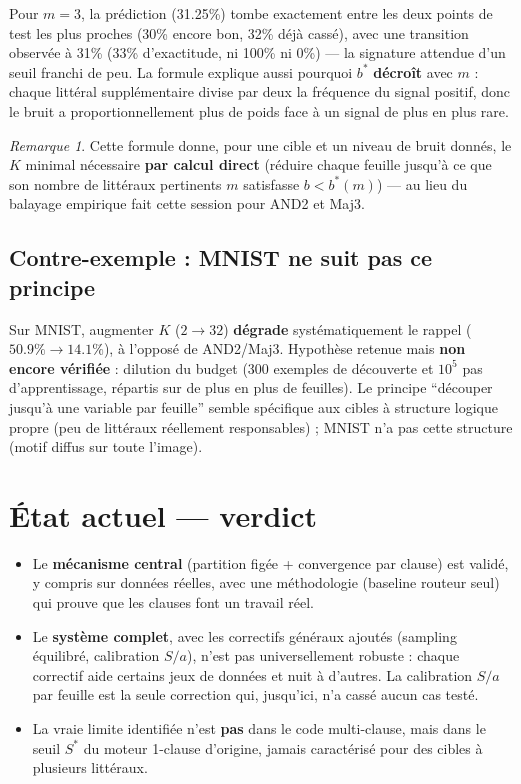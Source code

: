 \documentclass[12pt,a4paper]{article}
\theoremstyle{remark}
\newtheorem{remark}{Remarque}[section]
\newcommand{\Sstar}{S^{*}}
\begin{document}
Pour $m=3$, la prédiction (31.25\%) tombe exactement entre les deux points
de test les plus proches (30\% encore bon, 32\% déjà cassé), avec une
transition observée à 31\% (33\% d'exactitude, ni 100\% ni 0\%) --- la
signature attendue d'un seuil franchi de peu. La formule explique aussi
pourquoi $b^*$ \textbf{décroît} avec $m$ : chaque littéral supplémentaire
divise par deux la fréquence du signal positif, donc le bruit a
proportionnellement plus de poids face à un signal de plus en plus rare.

\begin{remark}
Cette formule donne, pour une cible et un niveau de bruit donnés, le $K$
minimal nécessaire \textbf{par calcul direct} (réduire chaque feuille jusqu'à
ce que son nombre de littéraux pertinents $m$ satisfasse $b < b^*(m)$) ---
au lieu du balayage empirique fait cette session pour AND2 et Maj3.
\end{remark}

\subsection*{Contre-exemple : MNIST ne suit pas ce principe}

Sur MNIST, augmenter $K$ ($2 \to 32$) \textbf{dégrade} systématiquement le
rappel ($50.9\% \to 14.1\%$), à l'opposé de AND2/Maj3. Hypothèse retenue
mais \textbf{non encore vérifiée} : dilution du budget (300 exemples de
découverte et $10^5$ pas d'apprentissage, répartis sur de plus en plus de
feuilles). Le principe ``découper jusqu'à une variable par feuille'' semble
spécifique aux cibles à structure logique propre (peu de littéraux
réellement responsables) ; MNIST n'a pas cette structure (motif diffus sur
toute l'image).

\section{État actuel --- verdict}

\begin{itemize}
  \item Le \textbf{mécanisme central} (partition figée + convergence par
        clause) est validé, y compris sur données réelles, avec une
        méthodologie (baseline routeur seul) qui prouve que les clauses
        font un travail réel.
  \item Le \textbf{système complet}, avec les correctifs généraux ajoutés
        (sampling équilibré, calibration $S/a$), n'est pas universellement
        robuste : chaque correctif aide certains jeux de données et nuit à
        d'autres. La calibration $S/a$ par feuille est la seule correction
        qui, jusqu'ici, n'a cassé aucun cas testé.
  \item La vraie limite identifiée n'est \textbf{pas} dans le code
        multi-clause, mais dans le seuil $\Sstar$ du moteur 1-clause
        d'origine, jamais caractérisé pour des cibles à plusieurs
        littéraux.
\end{itemize}
\end{document}
